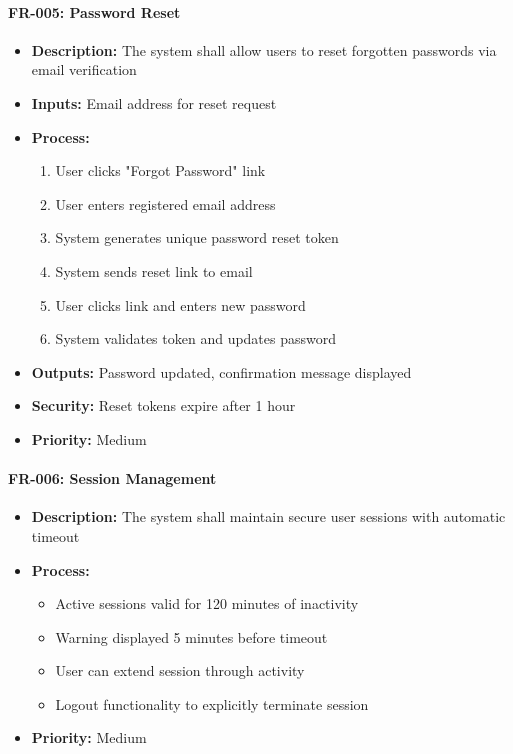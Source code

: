 \documentclass[12pt,a4paper]{article}
\begin{document}
\begin{enumerate}
\paragraph{FR-005: Password Reset}
\begin{itemize}
    \item \textbf{Description:} The system shall allow users to reset forgotten passwords via email verification
    \item \textbf{Inputs:} Email address for reset request
    \item \textbf{Process:}
    \begin{enumerate}
        \item User clicks "Forgot Password" link
        \item User enters registered email address
        \item System generates unique password reset token
        \item System sends reset link to email
        \item User clicks link and enters new password
        \item System validates token and updates password
    \end{enumerate}
    \item \textbf{Outputs:} Password updated, confirmation message displayed
    \item \textbf{Security:} Reset tokens expire after 1 hour
    \item \textbf{Priority:} Medium
\end{itemize}

\paragraph{FR-006: Session Management}
\begin{itemize}
    \item \textbf{Description:} The system shall maintain secure user sessions with automatic timeout
    \item \textbf{Process:}
    \begin{itemize}
        \item Active sessions valid for 120 minutes of inactivity
        \item Warning displayed 5 minutes before timeout
        \item User can extend session through activity
        \item Logout functionality to explicitly terminate session
    \end{itemize}
    \item \textbf{Priority:} Medium
\end{itemize}


\end{enumerate}
\end{document}
